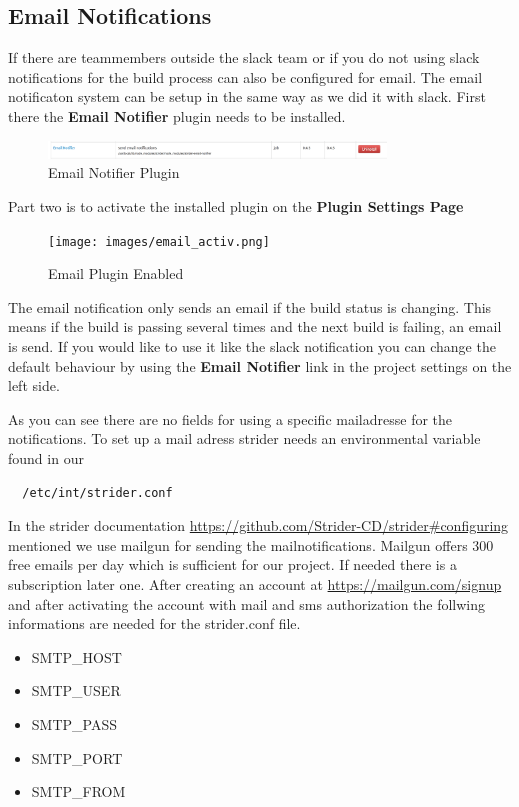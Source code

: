 \subsection{Email Notifications}
If there are teammembers outside the slack team or if you do not using slack notifications for the build process can also be configured
for email. The email notificaton system can be setup in the same way as we did it with slack. First there the \textbf{Email Notifier}
plugin needs to be installed.

\begin{figure}[h!]
  \centering
  \includegraphics[width=0.8\textwidth]{images/email_notifier.png}
  \caption{Email Notifier Plugin}
\end{figure}

Part two is to activate the installed plugin on the \textbf{Plugin Settings Page}

\begin{figure}[h!]
  \centering
  \texttt{[image: images/email\_activ.png]}
  \caption{Email Plugin Enabled}
\end{figure}

The email notification only sends an email if the build status is changing. This means if the build is passing several times and the next
build is failing, an email is send. If you would like to use it like the slack notification you can change the default behaviour by using the
\textbf{Email Notifier} link in the project settings on the left side.

As you can see there are no fields for using a specific mailadresse for the notifications. To set up a mail adress strider needs an environmental
variable found in our

\begin{lstlisting}
  /etc/int/strider.conf
\end{lstlisting}

In the strider documentation \url{https://github.com/Strider-CD/strider#configuring} mentioned we use mailgun for sending the mailnotifications.
Mailgun offers 300 free emails per day which is sufficient for our project. If needed there is a subscription later one. After creating an account
at \url{https://mailgun.com/signup} and after activating the account with mail and sms authorization the follwing informations are needed for the
strider.conf file.

\begin{itemize}
  \item SMTP_HOST
  \item SMTP_USER
  \item SMTP_PASS
  \item SMTP_PORT
  \item SMTP_FROM
\end{itemize}


